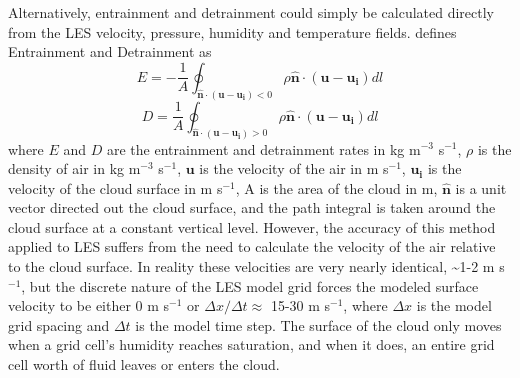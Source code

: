 \documentclass[12pt]{article}
\begin{document}
Alternatively, entrainment and detrainment could simply be calculated directly 
from the LES velocity, pressure, humidity and temperature fields.  
\cite{Siebesma1998} defines Entrainment and Detrainment as
\begin{equation}
E = -\frac{1}{A}\oint_{\mathbf{\hat{n}}\cdot(\mathbf{u} - \mathbf{u_i}) < 0}
\rho\mathbf{\hat{n}}\cdot(\mathbf{u}-\mathbf{u_i})dl
\end{equation}
\begin{equation}
D = \frac{1}{A}\oint_{\mathbf{\hat{n}}\cdot(\mathbf{u} - \mathbf{u_i}) > 0}
\rho\mathbf{\hat{n}}\cdot(\mathbf{u}-\mathbf{u_i})dl
\end{equation}
where $E$ and $D$ are the entrainment and detrainment rates in kg m$^{-3}$ 
s$^{-1}$, $\rho$ is the density of air in kg m$^{-3}$ s$^{-1}$, $\mathbf{u}$ is 
the velocity of the air in m s$^{-1}$, $\mathbf{u_i}$ is the velocity of the 
cloud surface in m s$^{-1}$, A is the area of the cloud in m, 
$\mathbf{\hat{n}}$ is a unit vector directed out the cloud surface, and the 
path integral is taken around the cloud surface at a constant vertical level.  
However, the accuracy of this method applied to LES suffers from the need to 
calculate the velocity of the air relative to the cloud surface.  In reality 
these velocities are very nearly identical, \textasciitilde{}1-2 m s$^{-1}$, 
but the discrete nature of the LES model grid forces the modeled surface 
velocity to be either 0 m s$^{-1}$ or $\Delta x / \Delta t \approx$ 15-30 
m s$^{-1}$, where $\Delta x$ is the model grid spacing and $\Delta t$ is the 
model time step.  The surface of the cloud only moves when a grid cell's 
humidity reaches saturation, and when it does, an entire grid cell worth of 
fluid leaves or enters the cloud.
\end{document}
